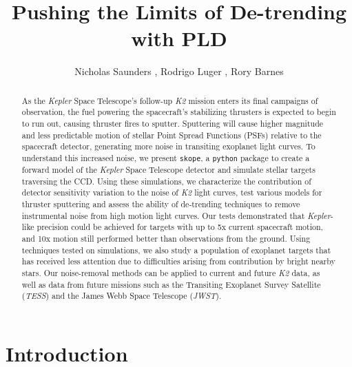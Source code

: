 \documentclass[12pt,preprint]{aastex}
\begin{document}
\title{Pushing the Limits of De-trending with PLD}


\author{Nicholas Saunders , Rodrigo Luger , Rory Barnes }


\begin{abstract}

	As the \textit{Kepler} Space Telescope's follow-up \textit{K2} mission enters its final campaigns of observation, the fuel powering the spacecraft's stabilizing thrusters is expected to begin to run out, causing thruster fires to sputter. Sputtering will cause higher magnitude and less predictable motion of stellar Point Spread Functions (PSFs) relative to the spacecraft detector, generating more noise in transiting exoplanet light curves. To understand this increased noise, we present \texttt{skope}, a \texttt{python} package to create a forward model of the \textit{Kepler} Space Telescope detector and simulate stellar targets traversing the CCD. Using these simulations, we characterize the contribution of detector sensitivity variation to the noise of \textit{K2} light curves, test various models for thruster sputtering and assess the ability of de-trending techniques to remove instrumental noise from high motion light curves. Our tests demonstrated that \textit{Kepler}-like precision could be achieved for targets with up to 5x current spacecraft motion, and 10x motion still performed better than observations from the ground. Using techniques tested on simulations, we also study a population of exoplanet targets that has received less attention due to difficulties arising from contribution by bright nearby stars. Our noise-removal methods can be applied to current and future \textit{K2} data, as well as data from future missions such as the Transiting Exoplanet Survey Satellite (\textit{TESS}) and the James Webb Space Telescope (\textit{JWST}).

\end{abstract}

\section{Introduction}
\end{document}
